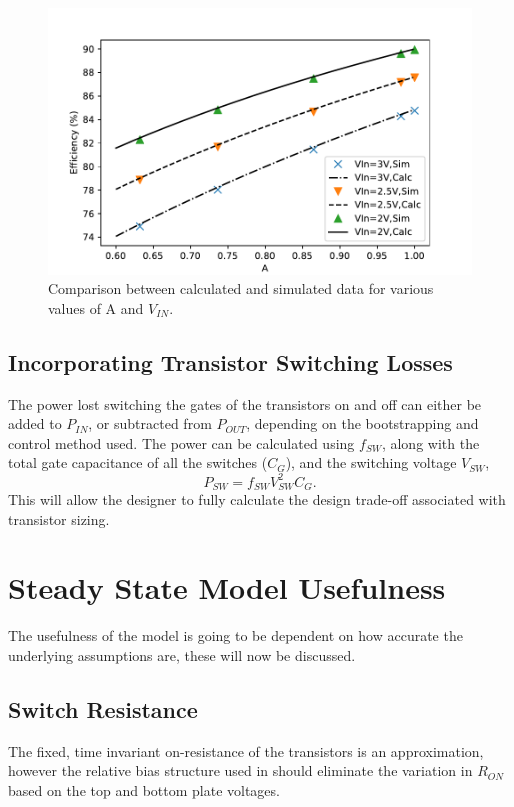 \documentclass[conference]{IEEEtran}
\begin{document}
 	\begin{figure}
 		\centering
 		\includegraphics[width=\linewidth]{Figures/eta_A.pdf}
 		\caption{Comparison between calculated and simulated data for various values of A and $V_{IN}$.}
 		\label{fig:Comp_A}
 	\end{figure}
 	\subsection{Incorporating Transistor Switching Losses}
 	The power lost switching the gates of the transistors on and off can either be added to $P_{IN}$, or subtracted from $P_{OUT}$, depending on the bootstrapping and control method used. The power can be calculated using $f_{SW}$, along with the total gate capacitance of all the switches ($C_{G}$), and the switching voltage $V_{SW}$,
 	\begin{equation}
 	P_{SW} = f_{SW}V_{SW}^2C_G.
 	\end{equation}
 	This will allow the designer to fully calculate the design trade-off associated with transistor sizing. 
 	
 	
 	\section{Steady State Model Usefulness}
 	The usefulness of the model is going to be dependent on how accurate the underlying assumptions are, these will now be discussed. 
 	\subsection{Switch Resistance}
 	The fixed, time invariant on-resistance of the transistors is an approximation, however the relative bias structure used in \cite{Butzen2019} should eliminate the variation in $R_{ON}$ based on the top and bottom plate voltages.
 	
\end{document}
